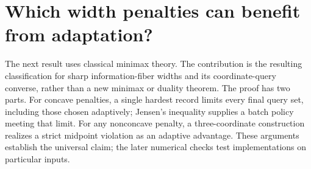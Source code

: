 \section{Which width penalties can benefit from adaptation?}
\label{sec:risk_classification}
The next result uses classical minimax theory. The contribution is the
resulting classification for sharp information-fiber widths and its
coordinate-query converse, rather than a new minimax or duality theorem.
The proof has two parts. For concave penalties, a single hardest record
limits every final query set, including those chosen adaptively; Jensen's
inequality supplies a batch policy meeting that limit. For any nonconcave
penalty, a three-coordinate construction realizes a strict midpoint
violation as an adaptive advantage. These arguments establish the universal
claim; the later numerical checks test implementations on particular inputs.

